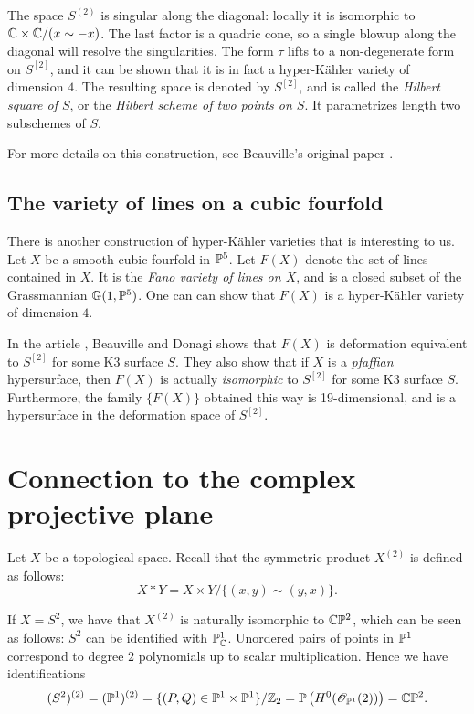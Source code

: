 The space $S^{(2)}$ is singular along the diagonal: locally it is isomorphic to $\C \times \C /(x \sim -x)$. The last factor is a quadric cone, so a single blowup along the diagonal will resolve the singularities. The form $\tau$ lifts to a non-degenerate form on $S^{[2]}$, and it can be shown that it is in fact a hyper-Kähler variety of dimension $4$. The resulting space is denoted by $S^{[2]}$, and is called the \emph{Hilbert square of $S$}, or the \emph{Hilbert scheme of two points on $S$}. It parametrizes length two subschemes of $S$.

For more details on this construction, see Beauville's original paper \cite{beauville_hyperkahler}.


\subsection{The variety of lines on a cubic fourfold}

There is another construction of hyper-Kähler varieties that is interesting to us. Let $X$ be a smooth cubic fourfold in $\P^5$. Let $F(X)$ denote the set of lines contained in $X$. It is the \emph{Fano variety of lines on $X$}, and is a closed subset of the Grassmannian $\mathbb G(1,\P^5)$. One can can show that $F(X)$ is a hyper-Kähler variety of dimension $4$.

In the article \cite{beauville_donagi_fano}, Beauville and Donagi shows that $F(X)$ is deformation equivalent to $S^{[2]}$ for some K3 surface $S$. They also show that if $X$ is a \emph{pfaffian} hypersurface, then $F(X)$ is actually \emph{isomorphic} to $S^{[2]}$ for some K3 surface $S$. Furthermore, the family $\{ F(X) \}$  obtained this way is 19-dimensional, and is a hypersurface in the deformation space of $S^{[2]}$.


\section{Connection to the complex projective plane}

Let $X$ be a topological space. Recall that the symmetric product $X^{(2)}$ is defined as follows:
\[
X \ast Y = X \times Y / \{ (x,y) \sim (y,x) \}.
\]

If $X=S^2$, we have that $X^{(2)}$ is naturally isomorphic to $\C \P^2$, which can be seen as follows: $S^2$ can be identified with $\P^1_\C$. Unordered pairs of points in $\P^1$ correspond to degree $2$ polynomials up to scalar multiplication. Hence we have identifications
$$
(S^2)^{(2)} = (\P^1)^{(2)} = \{ (P,Q) \in \P^1 \times \P^1 \} / \Z_2 = \P\left( H^0(\OO_{\P^1}(2)) \right)=\C \P^2.
$$

